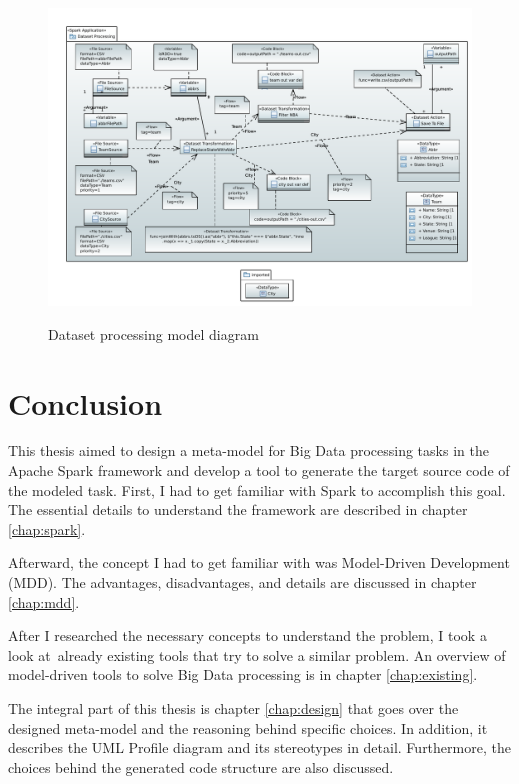 \begin{figure}[H]
\includegraphics[angle=90,width=1\textwidth]{obrazky-figures/dataset-processing-diagram.pdf}
\label{fig:datsetprocess}
\caption{Dataset processing model diagram}
\centering
\end{figure}


\chapter{Conclusion}

This thesis aimed to design a meta-model for Big Data processing tasks in the Apache Spark framework and develop a tool to generate the target source code of the modeled task. First, I had to get familiar with Spark to accomplish this goal. The essential details to understand the framework are described in chapter \ref{chap:spark}. 

Afterward, the concept I had to get familiar with was Model-Driven Development (MDD). The advantages, disadvantages, and details are discussed in chapter \ref{chap:mdd}. 

After I researched the necessary concepts to understand the problem, I took a look at~already existing tools that try to solve a similar problem. 
An overview of model-driven tools to solve Big Data processing is in chapter \ref{chap:existing}. 

The integral part of this thesis is chapter \ref{chap:design} that goes over the designed meta-model and the reasoning behind specific choices. In addition, it describes the UML Profile diagram and its stereotypes in detail. Furthermore, the choices behind the generated code structure are also discussed. 

